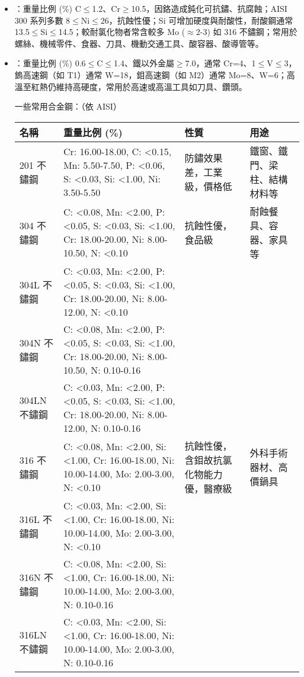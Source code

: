 \documentclass[a4paper,12pt]{report}
\begin{document}
\begin{itemize}
\begin{itemize}
\begin{longtable}[c]{|p{0.2\tw}|p{0.2\tw}|p{0.2\tw}|p{0.2\tw}|}
\end{longtable}\FloatBarrier
{}
\bit
\item {}：重量比例 (\%) C$\leq$1.2、Cr$\geq$10.5，因鉻造成鈍化可抗鏽、抗腐蝕；AISI 300 系列多數 8$\leq$Ni$\leq$26，抗蝕性優；Si 可增加硬度與耐酸性，耐酸鋼通常 13.5$\leq$Si$\leq$14.5；較耐氯化物者常含較多 Mo ($\approx$2-3) 如 316 不鏽鋼；常用於螺絲、機械零件、食器、刀具、機動交通工具、酸容器、酸導管等。
\item {}：重量比例 (\%) 0.6$\leq$C$\leq$1.4、鐵以外金屬$\geq$7.0，通常 Cr=4、1$\leq$V$\leq$3，鎢高速鋼（如 T1）通常 W=18，鉬高速鋼（如 M2）通常 Mo=8、W=6；高溫至紅熱仍維持高硬度，常用於高速或高溫工具如刀具、鑽頭。
\eit

一些常用合金鋼：（依 AISI）
\begin{longtable}[c]{|p{0.15\tw}|p{0.25\tw}|p{0.25\tw}|p{0.15\tw}|}
\hline
名稱 & 重量比例 (\%) & 性質 & 用途 \\\hline\endhead
201 不鏽鋼 & Cr: 16.00-18.00, C: <0.15, Mn: 5.50-7.50, P: <0.06, S: <0.03, Si: <1.00, Ni: 3.50-5.50 & 防鏽效果差，工業級，價格低 & 鐵窗、鐵門、梁柱、結構材料等 \\\hline
304 不鏽鋼 & C: <0.08, Mn: <2.00, P: <0.05, S: <0.03, Si: <1.00, Cr: 18.00-20.00, Ni: 8.00-10.50, N: <0.10 & 抗蝕性優，食品級 & 耐蝕餐具、容器、家具等 \\\cline{1-2}
304L 不鏽鋼 & C: <0.03, Mn: <2.00, P: <0.05, S: <0.03, Si: <1.00, Cr: 18.00-20.00, Ni: 8.00-12.00, N: <0.10 & & \\\cline{1-2}
304N 不鏽鋼 & C: <0.08, Mn: <2.00, P: <0.05, S: <0.03, Si: <1.00, Cr: 18.00-20.00, Ni: 8.00-10.50, N: 0.10-0.16 & & \\\cline{1-2}
304LN 不鏽鋼 & C: <0.03, Mn: <2.00, P: <0.05, S: <0.03, Si: <1.00, Cr: 18.00-20.00, Ni: 8.00-12.00, N: 0.10-0.16 & & \\\hline
316 不鏽鋼 & C: <0.08, Mn: <2.00, Si: <1.00, Cr: 16.00-18.00, Ni: 10.00-14.00, Mo: 2.00-3.00, N: <0.10 & 抗蝕性優，含鉬故抗氯化物能力優，醫療級 & 外科手術器材、高價鍋具 \\\cline{1-2}
316L 不鏽鋼 & C: <0.03, Mn: <2.00, Si: <1.00, Cr: 16.00-18.00, Ni: 10.00-14.00, Mo: 2.00-3.00, N: <0.10 & & \\\cline{1-2}
316N 不鏽鋼 & C: <0.08, Mn: <2.00, Si: <1.00, Cr: 16.00-18.00, Ni: 10.00-14.00, Mo: 2.00-3.00, N: 0.10-0.16 & & \\\cline{1-2}
316LN 不鏽鋼 & C: <0.03, Mn: <2.00, Si: <1.00, Cr: 16.00-18.00, Ni: 10.00-14.00, Mo: 2.00-3.00, N: 0.10-0.16 & & \\\hline

\end{longtable}
\end{itemize}
\end{itemize}
\end{document}
